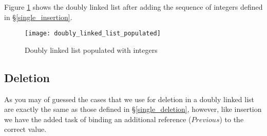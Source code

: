 Figure \ref{fig:doubly_linked_list_add} shows the doubly linked list after adding the sequence of integers defined in \S\ref{single_insertion}.

\begin{figure}[h]
\begin{center}
\texttt{[image: doubly\_linked\_list\_populated]}
\end{center}
\caption{Doubly linked list populated with integers} \label{fig:doubly_linked_list_add}
\end{figure}

\subsection{Deletion}
As you may of guessed the cases that we use for deletion in a doubly linked list are exactly the same as those defined in \S\ref{single_deletion}, however, like insertion we have the added task of binding an additional reference ($Previous$) to the correct value.

